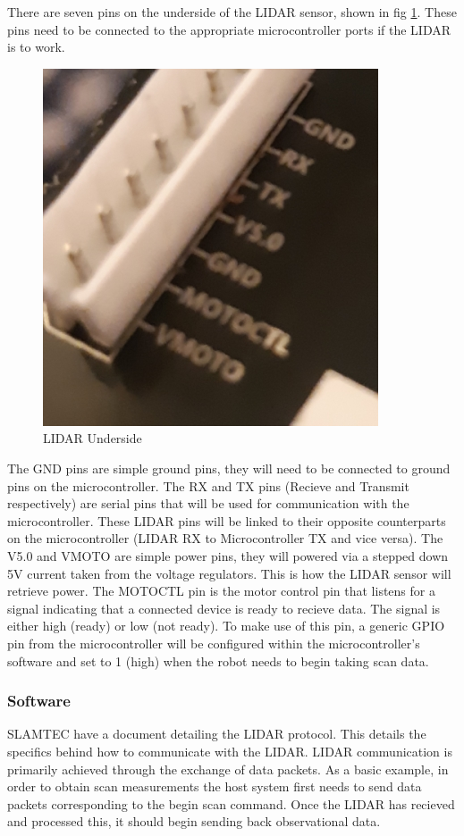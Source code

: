 				There are seven pins on the underside of the LIDAR sensor, shown in fig \ref{fig:lidarunderside}. These pins need to be connected to the appropriate microcontroller ports if the LIDAR is to work. 
				\begin{figure}[h]
					\centering
					\includegraphics[width=.4\linewidth]{SYNTHESIS/lidarunderside.png}
					\caption{LIDAR Underside}
					\label{fig:lidarunderside}
				\end{figure}
				
				The GND pins are simple ground pins, they will need to be connected to ground pins on the microcontroller. The RX and TX pins (Recieve and Transmit respectively) are serial pins that will be used for communication with the microcontroller. These LIDAR pins will be linked to their opposite counterparts on the microcontroller (LIDAR RX to Microcontroller TX and vice versa). The V5.0 and VMOTO are simple power pins, they will powered via a stepped down 5V current taken from the voltage regulators. This is how the LIDAR sensor will retrieve power. The MOTOCTL pin is the motor control pin that listens for a signal indicating that a connected device is ready to recieve data. The signal is either high (ready) or low (not ready). To make use of this pin, a generic GPIO pin from the microcontroller will be configured within the microcontroller's software and set to 1 (high) when the robot needs to begin taking scan data.
				
				\subsubsection{Software}
				SLAMTEC have a document detailing the LIDAR protocol. This details the specifics behind how to communicate with the LIDAR. LIDAR communication is primarily achieved through the exchange of data packets. As a basic example, in order to obtain scan measurements the host system first needs to send data packets corresponding to the begin scan command. Once the LIDAR has recieved and processed this, it should begin sending back observational data. 
				
